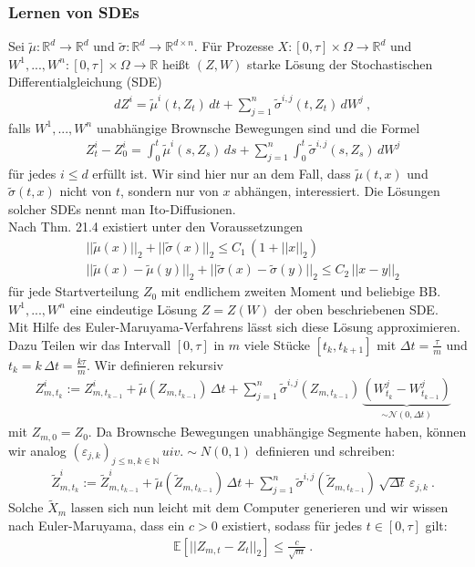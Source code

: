 \documentclass[12pt]{article}
\newcommand{\E}{\mathbb{E}}
\newcommand{\R}{\mathbb{R}}
\newcommand{\tZ}{\widetilde{Z}}
\newcommand{\tX}{\widetilde{X}}
\newcommand{\tmu}{\widetilde{\mu}}
\newcommand{\tsig}{\widetilde{\sigma}}
\newcommand{\N}{\mathbb{N}}
\begin{document}
	\subsubsection[Lernen von SDEs]{Lernen von SDEs}
	Sei $\tmu: \R^d \rightarrow \R^d$ und $\tsig: \R^d \rightarrow \R^{d \times n}$. Für Prozesse $X: [0,\tau] \times \Omega \rightarrow \R^d$ und $W^1,...,W^n : [0,\tau] \times \Omega \rightarrow \R$ heißt $(Z,W)$ starke Lösung der Stochastischen Differentialgleichung (SDE)
	\begin{align*}
		& dZ^i = \tmu^i(t,Z_t) \, dt + \sum\limits_{j=1}^n \tsig^{i,j}(t,Z_t) \, dW^j \ ,
	\end{align*}
	falls $W^1,...,W^n$ unabhängige Brownsche Bewegungen sind und die Formel
	\begin{align*}
		& Z_t^i - Z_0^i = \int_0^t \tmu^i(s,Z_s) \, ds + \sum\limits_{j=1}^n \int_0^t \tsig^{i,j}(s,Z_s) \, dW^j \tag{1}
	\end{align*}
	für jedes $i \leq d$ erfüllt ist. Wir sind hier nur an dem Fall, dass $\tmu(t,x)$ und $\tsig(t,x)$ nicht von $t$, sondern nur von $x$ abhängen, interessiert. Die Lösungen solcher SDEs nennt man Ito-Diffusionen.\\
	Nach \cite{PfaffiSkript} Thm. 21.4 existiert unter den Voraussetzungen
	\begin{align*}
		& ||\tmu(x)||_2 + ||\tsig(x)||_2 \leq C_1 \, (1+||x||_2)\\
		& ||\tmu(x)-\tmu(y)||_2 + ||\tsig(x)-\tsig(y)||_2 \leq C_2 \, ||x-y||_2 \tag{2}
	\end{align*}
	für jede Startverteilung $Z_0$ mit endlichem zweiten Moment und beliebige BB. $W^1,...,W^n$ eine eindeutige Lösung $Z = Z(W)$ der oben beschriebenen SDE.\\
	Mit Hilfe des Euler-Maruyama-Verfahrens lässt sich diese Lösung approximieren. Dazu Teilen wir das Intervall $[0,\tau]$ in $m$ viele Stücke $[t_k,t_{k+1}]$ mit $\Delta t = \frac{\tau}{m}$ und $t_k = k\, \Delta t = \frac{k\tau}{m}$. Wir definieren rekursiv
	\begin{align*}
		& Z^i_{m,t_k} := Z^i_{m,t_{k-1}} + \tmu(Z_{m,t_{k-1}}) \, \Delta t + \sum\limits_{j=1}^n \tsig^{i,j}(Z_{m,t_{k-1}}) \, \underbrace{(W^j_{t_k}-W^j_{t_{k-1}})}_{\sim \mathcal{N}(0,\Delta t)}
	\end{align*}
	mit $Z_{m,0} = Z_0$. Da Brownsche Bewegungen unabhängige Segmente haben, können wir analog $(\varepsilon_{j,k})_{j \leq n, k \in \N} \, uiv. \sim N(0,1)$ definieren und schreiben:
	\begin{align*}
		& \tZ^i_{m,t_k} := \tZ^i_{m,t_{k-1}} + \tmu(\tZ_{m,t_{k-1}}) \, \Delta t + \sum\limits_{j=1}^n \tsig^{i,j}(\tZ_{m,t_{k-1}}) \, \sqrt{\Delta t} \, \varepsilon_{j,k} \ .
	\end{align*}
	Solche $\tX_m$ lassen sich nun leicht mit dem Computer generieren und wir wissen nach Euler-Maruyama, dass ein $c > 0$ existiert, sodass für jedes $t \in [0,\tau]$ gilt:
	\begin{align*}
		& \E[||Z_{m,t} - Z_t||_2] \leq \frac{c}{\sqrt{m}} \ .
	\end{align*}
\end{document}
